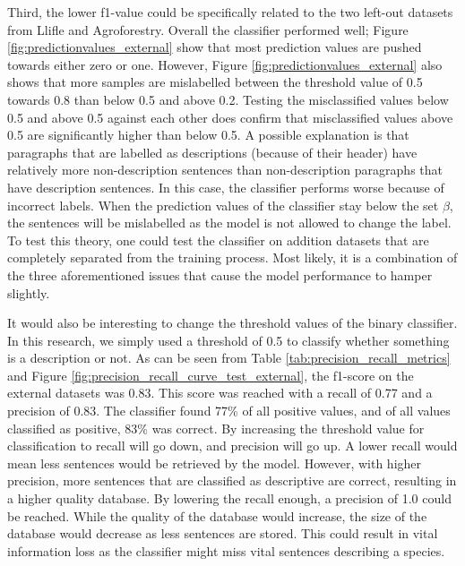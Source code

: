 \documentclass[a4paper, 12pt, oneside]{book} %
\begin{document}
Third, the lower f1-value could be specifically related to the two left-out datasets from Llifle and Agroforestry.
Overall the classifier performed well; Figure \ref{fig:predictionvalues_external} show that most prediction values are pushed towards either zero or one.
However, Figure \ref{fig:predictionvalues_external} also shows that more samples are mislabelled between the threshold value of 0.5 towards 0.8 than below 0.5 and above 0.2.
Testing the misclassified values below 0.5 and above 0.5 against each other does confirm that misclassified values above 0.5 are significantly higher than below 0.5.
A possible explanation is that paragraphs that are labelled as descriptions (because of their header) have relatively more non-description sentences than non-description paragraphs that have description sentences.
In this case, the classifier performs worse because of incorrect labels.
When the prediction values of the classifier stay below the set \(\beta\), the sentences will be mislabelled as the model is not allowed to change the label.
To test this theory, one could test the classifier on addition datasets that are completely separated from the training process.
Most likely, it is a combination of the three aforementioned issues that cause the model performance to hamper slightly.

It would also be interesting to change the threshold values of the binary classifier.
In this research, we simply used a threshold of 0.5 to classify whether something is a description or not.
As can be seen from Table \ref{tab:precision_recall_metrics} and Figure \ref{fig:precision_recall_curve_test_external}, the f1-score on the external datasets was 0.83. 
This score was reached with a recall of 0.77 and a precision of 0.83.
The classifier found 77\% of all positive values, and of all values classified as positive, 83\% was correct.
By increasing the threshold value for classification to recall will go down, and precision will go up.
A lower recall would mean less sentences would be retrieved by the model.
However, with higher precision, more sentences that are classified as descriptive are correct, resulting in a higher quality database.
By lowering the recall enough, a precision of 1.0 could be reached.
While the quality of the database would increase, the size of the database would decrease as less sentences are stored.
This could result in vital information loss as the classifier might miss vital sentences describing a species.
\end{document}
